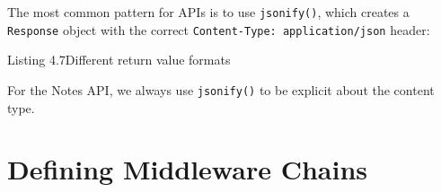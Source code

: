 \noindent{}The most common pattern for APIs is to use \texttt{jsonify()}, which creates a \texttt{Response} object with the correct \texttt{Content-}\allowbreak{}\texttt{Type:}\allowbreak{}\texttt{\ application/}\allowbreak{}\texttt{json} header:

\begin{codeboxcap}{\textcolor{accent}{Listing 4.7}\enspace Different return value formats}

\begin{Shaded}
\begin{Highlighting}[]

\OperatorTok{=}\NormalTok{)}

\NormalTok{(}\NormalTok{)}
       

\NormalTok{(}\NormalTok{)}
    \NormalTok{: }\NormalTok{\})  }

\NormalTok{(}\NormalTok{)}
    \NormalTok{: }\NormalTok{\}), }  

\NormalTok{(}\NormalTok{)}
    \NormalTok{ \{}\NormalTok{: }\NormalTok{\}  }
\end{Highlighting}
\end{Shaded}

\end{codeboxcap}

\noindent{}For the Notes API, we always use \texttt{jsonify()} to be explicit about the content type.

\setcounter{section}{5}
\section{Defining Middleware Chains}\label{04-request-handling-paths:46-defining-middleware-chains}

